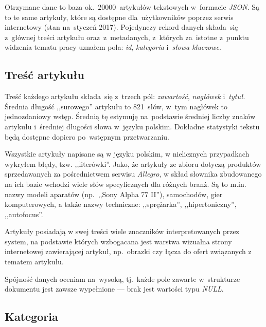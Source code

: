 \documentclass[pl]{minipw} %
\begin{document}
Otrzymane dane to baza ok.~20000~artykułów tekstowych w~formacie \textit{JSON}. Są to te same artykuły, które są dostępne dla~użytkowników poprzez serwis internetowy (stan na~styczeń 2017). Pojedynczy rekord danych składa~się z~głównej treści artykułu oraz~z~metadanych, z~których za~istotne z~punktu widzenia tematu pracy uznałem pola: \textit{id}, \textit{kategoria} i~\textit{słowa kluczowe}.

\subsection{Treść artykułu}

Treść każdego artykułu składa~się z~trzech pól: \textit{zawartość}, \textit{nagłówek} i~\textit{tytuł}. Średnia długość ,,surowego'' artykułu to 821~słów, w~tym nagłówek to jednozdaniowy wstęp. Średnią tę estymuję na~podstawie średniej liczby znaków artykułu i~średniej długości słowa w~języku polskim. Dokładne statystyki tekstu będą dostępne dopiero po~wstępnym przetwarzaniu.

Wszystkie artykuły napisane są w języku polskim, w nielicznych przypadkach wykryłem błędy, tzw. ,,literówki''. Jako, że artykuły ze zbioru dotyczą produktów sprzedawanych za pośrednictwem serwisu \textit{Allegro}, w skład słownika zbudowanego na ich bazie wchodzi wiele słów specyficznych dla różnych branż. Są to m.in. nazwy modeli aparatów (np.~,,Sony Alpha 77 II''), samochodów, gier komputerowych, a także nazwy techniczne: ,,sprężarka'', ,,hipertoniczny'', ,,autofocus''.

Artykuły posiadają w swej treści wiele znaczników interpretowanych przez system, na podstawie których wzbogacana jest warstwa wizualna strony internetowej zawierającej artykuł, np.~obrazki czy łącza do ofert związanych z tematem artykułu.

Spójność danych oceniam na~wysoką, tj.~każde pole zawarte w~strukturze dokumentu jest zawsze wypełnione --- brak jest wartości typu \textit{NULL}.

\subsection{Kategoria}
\end{document}
